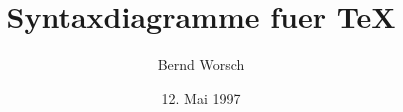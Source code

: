 \documentclass{article}
\begin{document}
\title{Syntaxdiagramme fuer \TeX}
\author{Bernd Worsch}
\date{12. Mai 1997}

\maketitle

\begin{Syntaxdiagramm}%
\end{Syntaxdiagramm}
 
\begin{Syntaxdiagramm}%
\end{Syntaxdiagramm}

\begin{Syntaxdiagramm}%
\end{Syntaxdiagramm}

\begin{Syntaxdiagramm}%
\end{Syntaxdiagramm}

\begin{Syntaxdiagramm}%
\end{Syntaxdiagramm}

\begin{Syntaxdiagramm}%
\end{Syntaxdiagramm}

\begin{Syntaxdiagramm}%
  \begin{Alternativen}{}{}%
    \\  
    \\
  \end{Alternativen}%
\end{Syntaxdiagramm}

\begin{Syntaxdiagramm}%
\end{Syntaxdiagramm}
\end{document}
